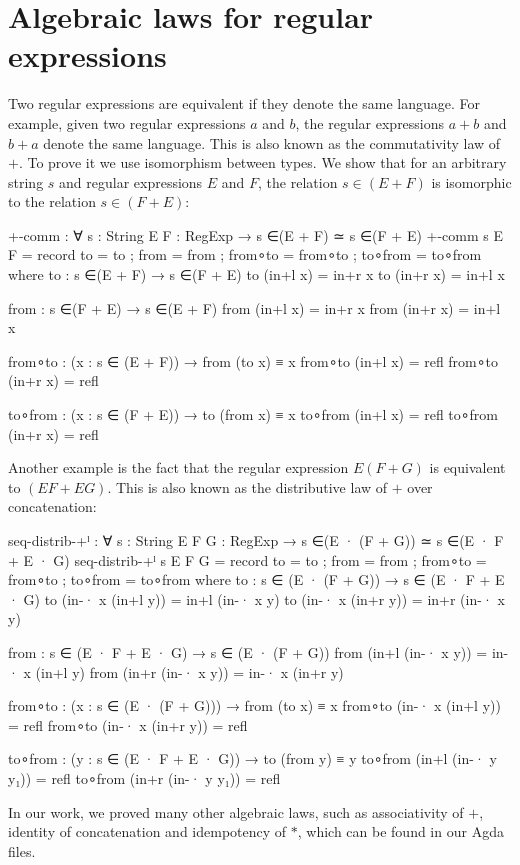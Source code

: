 \section{Algebraic laws for regular expressions}
Two regular expressions are equivalent if they denote the same language. For example, given two regular expressions $a$ and $b$, the regular expressions $a + b$ and $b + a$ denote the same language. This is also known as the commutativity law of $+$. To prove it we use isomorphism between types. We show that for an arbitrary string $s$ and regular expressions $E$ and $F$, the relation $s \in (E + F)$ is isomorphic to the relation $s \in (F + E)$: 
\begin{agda}
+-comm : ∀ {s : String} {E F : RegExp}
  → s ∈(E + F) ≃ s ∈(F + E)
+-comm {s} {E} {F} = 
  record 
    { to      = to
    ; from    = from
    ; from∘to = from∘to
    ; to∘from = to∘from
    }
  where
    to : s ∈(E + F) → s ∈(F + E)
    to (in+l x) = in+r x
    to (in+r x) = in+l x

    from : s ∈(F + E) → s ∈(E + F)
    from (in+l x) = in+r x
    from (in+r x) = in+l x

    from∘to : (x : s ∈ (E + F)) → from (to x) ≡ x
    from∘to (in+l x) = refl
    from∘to (in+r x) = refl

    to∘from : (x : s ∈ (F + E)) → to (from x) ≡ x
    to∘from (in+l x) = refl
    to∘from (in+r x) = refl
\end{agda}
Another example is the fact that the regular expression $E(F + G)$ is equivalent to $(EF + EG)$. This is also known as the distributive law of $+$ over concatenation:
\begin{agda}
seq-distrib-+ˡ : ∀ {s : String} {E F G : RegExp}
  → s ∈(E · (F + G)) ≃ s ∈(E · F + E · G)
seq-distrib-+ˡ {s} {E} {F} {G} =
  record
    { to      = to
    ; from    = from
    ; from∘to = from∘to
    ; to∘from = to∘from }
  where
    to : s ∈ (E · (F + G)) → s ∈ (E · F + E · G)
    to (in-· x (in+l y)) = in+l (in-· x y)
    to (in-· x (in+r y)) = in+r (in-· x y)

    from : s ∈ (E · F + E · G) → s ∈ (E · (F + G))
    from (in+l (in-· x y)) = in-· x (in+l y)
    from (in+r (in-· x y)) = in-· x (in+r y)

    from∘to : (x : s ∈ (E · (F + G))) → from (to x) ≡ x
    from∘to (in-· x (in+l y)) = refl
    from∘to (in-· x (in+r y)) = refl

    to∘from : (y : s ∈ (E · F + E · G)) → to (from y) ≡ y
    to∘from (in+l (in-· y y₁)) = refl
    to∘from (in+r (in-· y y₁)) = refl
\end{agda}
In our work, we proved many other algebraic laws, such as associativity of $+$, identity of concatenation and idempotency of $*$, which can be found in our Agda files.

